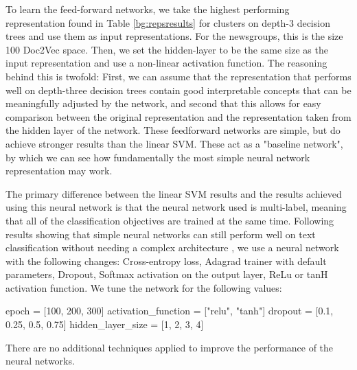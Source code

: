To learn the feed-forward networks, we take the highest performing representation found in Table \ref{bg:repsresults} for clusters on depth-3 decision trees and use them as input representations.   For the newsgroups, this is the size 100 Doc2Vec space. Then, we set the hidden-layer to be the same size as the input representation and use a non-linear activation function.  The reasoning behind this is twofold: First, we can assume that the representation that performs well on depth-three decision trees contain good interpretable concepts that can be meaningfully adjusted by the network, and second that this allows for easy comparison between the original representation and the representation taken from the hidden layer of the network. These feedforward networks are simple, but do achieve stronger results than the linear SVM. These act as a "baseline network", by which we can see how fundamentally the most simple neural network representation may work. 

The primary difference between the linear SVM results and the results achieved using this neural network is that the neural network used is multi-label, meaning that all of the classification objectives are trained at the same time. Following results showing that simple neural networks can still perform well on text classification without needing a complex architecture  \cite{Lakhotia2018} \cite{Nam2014}, we use a neural network with the following changes: Cross-entropy loss, Adagrad trainer with default parameters, Dropout, Softmax activation on the output layer, ReLu or tanH activation function. We tune the network for the following values: 

epoch = [100, 200, 300]
activation_function = ["relu", "tanh"]
dropout = [0.1, 0.25, 0.5, 0.75]
hidden_layer_size = [1,  2, 3, 4]



There are no additional techniques applied to improve the performance of the neural networks.